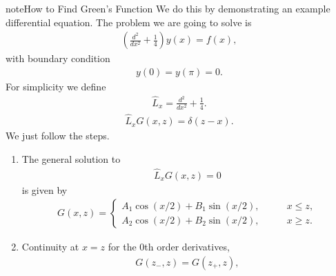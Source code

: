 \documentclass[letterpaper,10pt,english]{sphinxmanual}
\begin{document}
\begin{sphinxadmonition}{note}{How to Find Green’s Function}
We do this by demonstrating an example differential equation. The problem we are going to solve is
\begin{equation*}
\begin{split}\left(\frac{d^2}{dx^2} + \frac{1}{4}\right) y(x) = f(x),\end{split}
\end{equation*}
with boundary condition
\label{\detokenize{equation-solving-in-neuroscience/green-function:equation-eqn-green-function-example2-bc}}\begin{equation}\label{equation:equation-solving-in-neuroscience/green-function:eqn-green-function-example2-bc}
\begin{split}y(0) = y(\pi) = 0.\end{split}
\end{equation}
For simplicity we define
\begin{equation*}
\begin{split}\hat L_x = \frac{d^2}{dx^2} + \frac{1}{4}.\end{split}
\end{equation*}
\begin{equation*}
\begin{split}\hat L_x G(x,z) = \delta(z-x).\end{split}
\end{equation*}
We just follow the steps.
\begin{enumerate}
\item {} 
The general solution to
\begin{equation*}
\begin{split}\hat L_x G(x,z) = 0\end{split}
\end{equation*}
is given by
\begin{equation*}
\begin{split}G(x,z) = \begin{cases}
A_1\cos (x/2) + B_1 \sin(x/2), & \qquad x \leq z, \\
A_2\cos (x/2) + B_2 \sin(x/2), & \qquad x \geq z.
\end{cases}\end{split}
\end{equation*}
\item {} 
Continuity at \(x=z\) for the 0th order derivatives,
\begin{equation*}
\begin{split}G(z_-,z) = G(z_+,z),\end{split}

\end{equation*}
\end{enumerate}
\end{sphinxadmonition}
\end{document}

